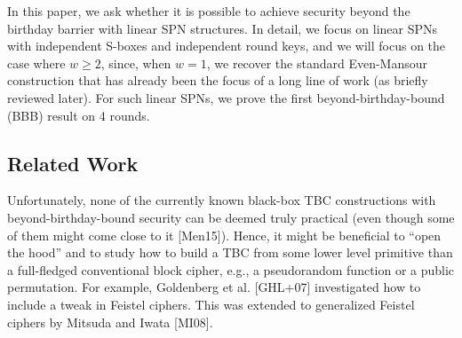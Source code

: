 In this paper, we ask whether it is possible to achieve security beyond the birthday barrier with linear SPN structures. In detail, we focus on linear SPNs with independent S-boxes and independent round keys, and we will focus on the case where $w\geq2$, since, when $w = 1$, we recover the standard Even-Mansour construction that has already been the focus
of a long line of work (as briefly reviewed later). For such linear SPNs, we prove the first beyond-birthday-bound (BBB) result on 4 rounds.








%
%
%




\subsection{Related Work}


Unfortunately, none of the currently known black-box
TBC constructions with beyond-birthday-bound security can be deemed truly practical (even
though some of them might come close to it [Men15]). Hence, it might be beneficial to “open
the hood” and to study how to build a TBC from some lower level primitive than a full-fledged
conventional block cipher, e.g., a pseudorandom function or a public permutation. For example,
Goldenberg et al. [GHL+07] investigated how to include a tweak in Feistel ciphers. This was
extended to generalized Feistel ciphers by Mitsuda and Iwata [MI08].




